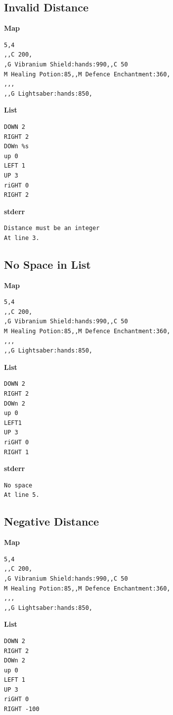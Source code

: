 \documentclass{article}
\begin{document}
\subsection{Invalid Distance}

\quad \textbf{Map}
\begin{lstlisting}
5,4
,,C 200,
,G Vibranium Shield:hands:990,,C 50
M Healing Potion:85,,M Defence Enchantment:360,
,,,
,,G Lightsaber:hands:850,
\end{lstlisting}

\textbf{List}
\begin{lstlisting}
DOWN 2
RIGHT 2
DOWn %s
up 0
LEFT 1
UP 3
riGHT 0
RIGHT 2
\end{lstlisting}
\pagebreak

\textbf{stderr}
\begin{lstlisting}
Distance must be an integer
At line 3.
\end{lstlisting}

\subsection{No Space in List}

\quad \textbf{Map}
\begin{lstlisting}
5,4
,,C 200,
,G Vibranium Shield:hands:990,,C 50
M Healing Potion:85,,M Defence Enchantment:360,
,,,
,,G Lightsaber:hands:850,
\end{lstlisting}

\textbf{List}
\begin{lstlisting}
DOWN 2
RIGHT 2
DOWn 2
up 0
LEFT1
UP 3
riGHT 0
RIGHT 1
\end{lstlisting}
\pagebreak

\textbf{stderr}
\begin{lstlisting}
No space
At line 5.
\end{lstlisting}

\subsection{Negative Distance}

\quad \textbf{Map}
\begin{lstlisting}
5,4
,,C 200,
,G Vibranium Shield:hands:990,,C 50
M Healing Potion:85,,M Defence Enchantment:360,
,,,
,,G Lightsaber:hands:850,
\end{lstlisting}

\textbf{List}
\begin{lstlisting}
DOWN 2
RIGHT 2
DOWn 2
up 0
LEFT 1
UP 3
riGHT 0
RIGHT -100
\end{lstlisting}
\pagebreak
\end{document}
